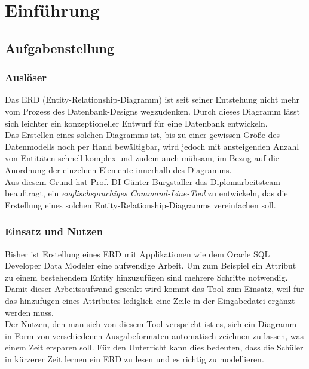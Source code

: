 \part{Einführung}

\chapter{Aufgabenstellung}
\label{cha:Aufgabenstellung}

\prc{}
\section{Auslöser}

Das ERD (Entity-Relationship-Diagramm) ist seit seiner Entstehung nicht mehr vom Prozess des Datenbank-Designs wegzudenken. Durch dieses Diagramm lässt sich leichter ein konzeptioneller Entwurf für eine Datenbank entwickeln. 
\\

\noindent
Das Erstellen eines solchen Diagramms ist, bis zu einer gewissen Größe des Datenmodells noch per Hand bewältigbar, wird jedoch mit ansteigenden Anzahl von Entitäten schnell komplex und zudem auch mühsam, im Bezug auf die Anordnung der einzelnen Elemente innerhalb des Diagramms.
\\

\noindent
Aus diesem Grund hat Prof. DI Günter Burgstaller das Diplomarbeitsteam beauftragt, ein \textit{englischsprachiges Command-Line-Tool} zu entwickeln, das die Erstellung eines solchen Entity-Relationship-Diagramms vereinfachen soll.
\\

\section{Einsatz und Nutzen}

Bisher ist Erstellung eines ERD mit Applikationen wie dem Oracle SQL Developer Data Modeler eine aufwendige Arbeit. Um zum Beispiel ein Attribut zu einem bestehendem Entity hinzuzufügen sind mehrere Schritte notwendig. Damit dieser Arbeitsaufwand gesenkt wird kommt das Tool zum Einsatz, weil für das hinzufügen eines Attributes lediglich eine Zeile in der Eingabedatei ergänzt werden muss. 
\\

\noindent
Der Nutzen, den man sich von diesem Tool verspricht ist es, sich ein Diagramm in Form von verschiedenen Ausgabeformaten automatisch zeichnen zu lassen, was einem Zeit ersparen soll. Für den Unterricht kann dies bedeuten, dass die Schüler in kürzerer Zeit lernen ein ERD zu lesen und es richtig zu modellieren.
\\


